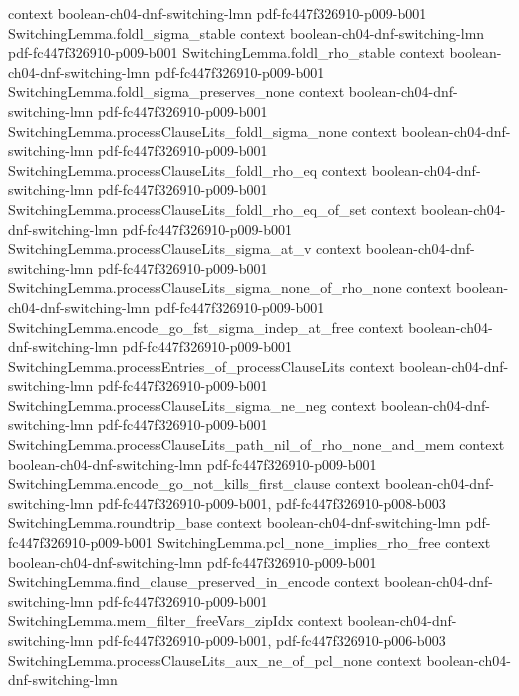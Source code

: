 \begin{theorem}
  {context}
  {boolean-ch04-dnf-switching-lmn}
  {pdf-fc447f326910-p009-b001}
\proofstep
  {SwitchingLemma.foldl_sigma_stable}
  {context}
  {boolean-ch04-dnf-switching-lmn}
  {pdf-fc447f326910-p009-b001}
\proofstep
  {SwitchingLemma.foldl_rho_stable}
  {context}
  {boolean-ch04-dnf-switching-lmn}
  {pdf-fc447f326910-p009-b001}
\proofstep
  {SwitchingLemma.foldl_sigma_preserves_none}
  {context}
  {boolean-ch04-dnf-switching-lmn}
  {pdf-fc447f326910-p009-b001}
\proofstep
  {SwitchingLemma.processClauseLits_foldl_sigma_none}
  {context}
  {boolean-ch04-dnf-switching-lmn}
  {pdf-fc447f326910-p009-b001}
\proofstep
  {SwitchingLemma.processClauseLits_foldl_rho_eq}
  {context}
  {boolean-ch04-dnf-switching-lmn}
  {pdf-fc447f326910-p009-b001}
\proofstep
  {SwitchingLemma.processClauseLits_foldl_rho_eq_of_set}
  {context}
  {boolean-ch04-dnf-switching-lmn}
  {pdf-fc447f326910-p009-b001}
\proofstep
  {SwitchingLemma.processClauseLits_sigma_at_v}
  {context}
  {boolean-ch04-dnf-switching-lmn}
  {pdf-fc447f326910-p009-b001}
\proofstep
  {SwitchingLemma.processClauseLits_sigma_none_of_rho_none}
  {context}
  {boolean-ch04-dnf-switching-lmn}
  {pdf-fc447f326910-p009-b001}
\proofstep
  {SwitchingLemma.encode_go_fst_sigma_indep_at_free}
  {context}
  {boolean-ch04-dnf-switching-lmn}
  {pdf-fc447f326910-p009-b001}
\proofstep
  {SwitchingLemma.processEntries_of_processClauseLits}
  {context}
  {boolean-ch04-dnf-switching-lmn}
  {pdf-fc447f326910-p009-b001}
\proofstep
  {SwitchingLemma.processClauseLits_sigma_ne_neg}
  {context}
  {boolean-ch04-dnf-switching-lmn}
  {pdf-fc447f326910-p009-b001}
\proofstep
  {SwitchingLemma.processClauseLits_path_nil_of_rho_none_and_mem}
  {context}
  {boolean-ch04-dnf-switching-lmn}
  {pdf-fc447f326910-p009-b001}
\proofstep
  {SwitchingLemma.encode_go_not_kills_first_clause}
  {context}
  {boolean-ch04-dnf-switching-lmn}
  {pdf-fc447f326910-p009-b001,
    pdf-fc447f326910-p008-b003}
\proofstep
  {SwitchingLemma.roundtrip_base}
  {context}
  {boolean-ch04-dnf-switching-lmn}
  {pdf-fc447f326910-p009-b001}
\proofstep
  {SwitchingLemma.pcl_none_implies_rho_free}
  {context}
  {boolean-ch04-dnf-switching-lmn}
  {pdf-fc447f326910-p009-b001}
\proofstep
  {SwitchingLemma.find_clause_preserved_in_encode}
  {context}
  {boolean-ch04-dnf-switching-lmn}
  {pdf-fc447f326910-p009-b001}
\proofstep
  {SwitchingLemma.mem_filter_freeVars_zipIdx}
  {context}
  {boolean-ch04-dnf-switching-lmn}
  {pdf-fc447f326910-p009-b001,
    pdf-fc447f326910-p006-b003}
\proofstep
  {SwitchingLemma.processClauseLits_aux_ne_of_pcl_none}
  {context}
  {boolean-ch04-dnf-switching-lmn}

\end{theorem}
